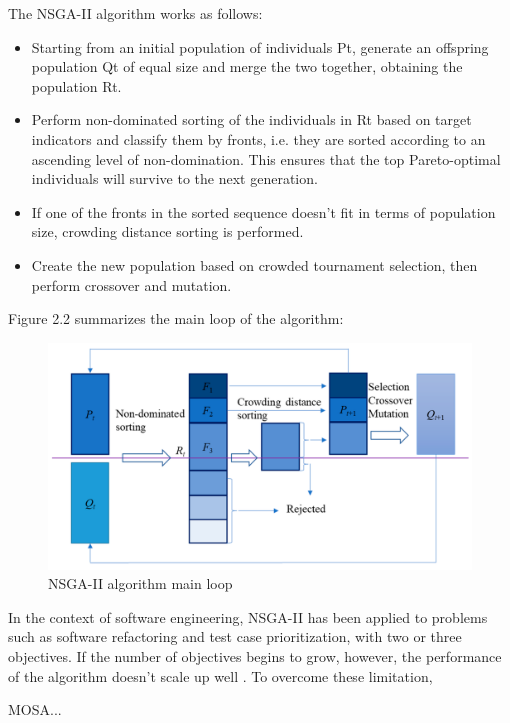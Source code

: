 The NSGA-II algorithm works as follows:
\begin{itemize}
    \item Starting from an initial population of individuals Pt, generate an offspring population Qt of equal size and merge the two together, obtaining the population Rt.
    \item Perform non-dominated sorting of the individuals in Rt based on target indicators and classify them by fronts, i.e. they are sorted according to an ascending level of non-domination.  This ensures that the top Pareto-optimal individuals will survive to the next generation.
    \item If one of the fronts in the sorted sequence doesn't fit in terms of population size, crowding distance sorting is performed.
    \item Create the new population based on crowded tournament selection, then perform crossover and mutation. 
\end{itemize}


Figure 2.2 summarizes the main loop of the algorithm:
\begin{figure}[!h]
    \centering
    \includegraphics[scale=0.1]{./figures/nsga-ii.png}
    \caption{NSGA-II algorithm main loop}
    \label{fig:NSGA-II algorithm main loop}
\end{figure}


In the context of software engineering, NSGA-II has been applied to problems such as software refactoring and test case prioritization,
with two or three objectives. If the number of objectives begins to grow, however, the performance of the algorithm doesn't scale up well \cite{DBLP:journals/csur/LiLTY15}.
To overcome these limitation,


MOSA...

